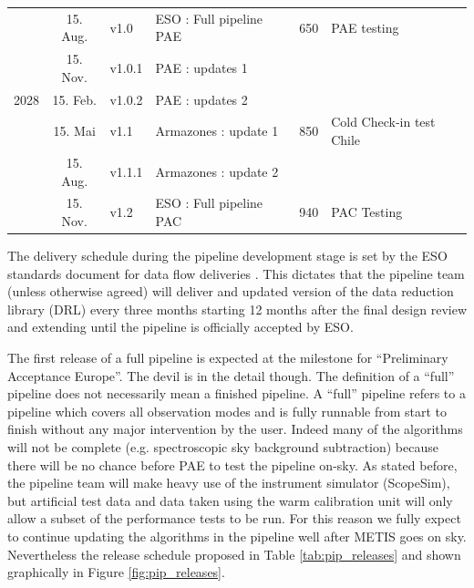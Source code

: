 \documentclass[a4paper]{spie}  %
\begin{document}
\begin{table}[]
\begin{tabular}{|lcllll|}
                                  & 15. Aug.      & v1.0             & ESO : Full pipeline PAE         & {650}                & PAE testing                          \\
                                  & 15. Nov.      & v1.0.1           & PAE : updates 1              &                                        &                                      \\
\hline
{2028}          & 15. Feb.      & v1.0.2           & PAE : updates 2               &                                        &                                      \\
                                  & 15. Mai       & v1.1             & Armazones : update 1           & {850}                & Cold Check-in test Chile             \\
                                  & 15. Aug.      & v1.1.1           &Armazones : update 2          &                                        &                                      \\
                                  & 15. Nov.      & v1.2             & ESO : Full pipeline PAC         & {940}                & PAC Testing       \\         
\hline
\end{tabular}
\end{table}


The delivery schedule during the pipeline development stage is set by the ESO standards document for data flow deliveries \cite{1618}. 
This dictates that the pipeline team (unless otherwise agreed) will deliver and updated version of the data reduction library (DRL) every three months starting 12 months after the final design review and extending until the pipeline is officially accepted by ESO.

The first release of a full pipeline is expected at the milestone for ``Preliminary Acceptance Europe''.
The devil is in the detail though.
The definition of a ``full'' pipeline does not necessarily mean a finished pipeline.
A ``full'' pipeline refers to a pipeline which covers all observation modes and is fully runnable from start to finish without any major intervention by the user.
Indeed many of the algorithms will not be complete (e.g. spectroscopic sky background subtraction) because there will be no chance before PAE to test the pipeline on-sky. 
As stated before, the pipeline team will make heavy use of the instrument simulator (ScopeSim), but artificial test data and data taken using the warm calibration unit will only allow a subset of the performance tests to be run.
For this reason we fully expect to continue updating the algorithms in the pipeline well after METIS goes on sky.
Nevertheless the release schedule proposed in Table \ref{tab:pip_releases} and shown graphically in Figure \ref{fig:pip_releases}.
\end{document}
